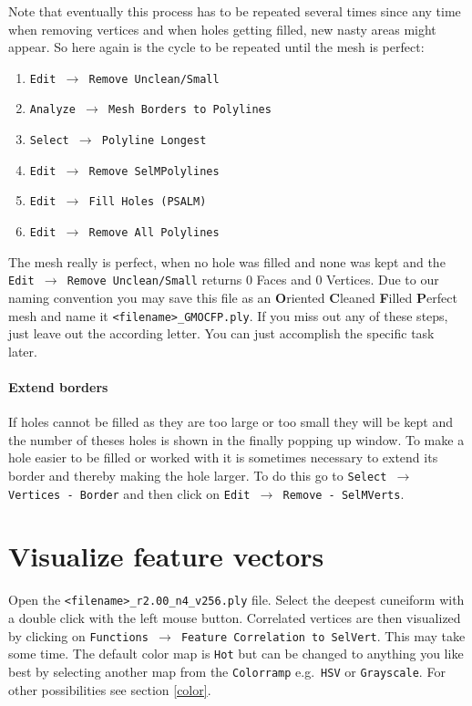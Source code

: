 Note that eventually this process has to be repeated several times since any time when removing vertices and when holes getting filled, new nasty areas might appear. So here again is the cycle to be repeated until the mesh is perfect:

\begin{enumerate}
\item  \texttt{Edit $\rightarrow$ Remove Unclean/Small} 
\item  \texttt{Analyze $\rightarrow$ Mesh Borders to Polylines}
\item  \texttt{Select $\rightarrow$ Polyline Longest}
\item  \texttt{Edit $\rightarrow$ Remove SelMPolylines}
\item  \texttt{Edit $\rightarrow$ Fill Holes (PSALM)}
\item  \texttt{Edit $\rightarrow$ Remove All Polylines}
\end{enumerate}

The mesh really is perfect, when no hole was filled and none was kept and the \texttt{Edit $\rightarrow$ Remove Unclean/Small} returns 0 Faces and 0 Vertices. Due to our naming convention you may save this file as an  {\bf O}riented {\bf C}leaned {\bf F}illed {\bf P}erfect mesh and name it {\tt <filename>\_GMOCFP.ply}. If you miss out any of these steps, just leave out the according letter. You can just accomplish the specific task later.




\paragraph{Extend borders}
If holes cannot be filled as they are too large or too small they will be kept and the number of theses holes is shown in the finally popping up window. 
To make a hole easier to be filled or worked with it is sometimes necessary to extend its border and thereby making the hole larger. To do this go to \texttt{Select $\rightarrow$ Vertices - Border} and then click on \texttt{Edit $\rightarrow$ Remove - SelMVerts}.



\section{Visualize feature vectors}\label{wizard} 
Open the \texttt{<filename>\_r2.00\_n4\_v256.ply} file. 
Select the deepest cuneiform with a double click with the left mouse button. Correlated vertices are then visualized by clicking on \texttt{Functions $\rightarrow$ Feature Correlation to SelVert}. This may take some time. The default color map is {\tt Hot} but can be changed to anything you like best by selecting another map from the  \texttt{Colorramp}  e.g.~{\tt HSV} or {\tt Grayscale}. For other possibilities see section \ref{color}.


